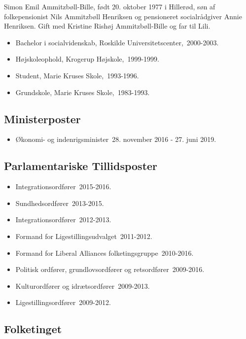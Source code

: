 \documentclass[11pt, a4paper]{awesome-cv}
\begin{document}
\makecvheader[R]
\makelettertitle
\begin{cvletter}
Simon Emil Ammitzbøll-Bille, født 20. oktober 1977 i Hillerød, søn af folkepensionist Nils Ammitzbøll Henriksen og pensioneret socialrådgiver Annie Henriksen. Gift med Kristine Rishøj Ammitzbøll-Bille og far til Lili.

\begin{itemize}
\item Bachelor i socialvidenskab, Roskilde Universitetscenter, 2000-2003.
\item Højskoleophold, Krogerup Højskole, 1999-1999.
\item Student, Marie Kruses Skole, 1993-1996.
\item Grundskole, Marie Kruses Skole, 1983-1993.
\end{itemize}
\subsection*{Ministerposter}
\begin{itemize}
\item Økonomi- og indenrigsminister 28. november 2016 - 27. juni 2019.
\end{itemize}
\subsection*{Parlamentariske Tillidsposter}
\begin{itemize}
\item Integrationsordfører 2015-2016.
\item Sundhedsordfører 2013-2015.
\item Integrationsordfører 2012-2013.
\item Formand for Ligestillingsudvalget 2011-2012.
\item Formand for Liberal Alliances folketingsgruppe 2010-2016.
\item Politisk ordfører, grundlovsordfører og retsordfører 2009-2016.
\item Kulturordfører og idrætsordfører 2009-2013.
\item Ligestillingsordfører 2009-2012.
\end{itemize}
\subsection*{Folketinget}

\end{cvletter}
\end{document}
